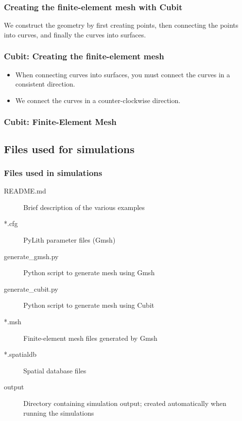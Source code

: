 \documentclass[aspectratio=169]{beamer}
\begin{document}
\begin{frame}
  \frametitle{Creating the finite-element mesh with Cubit}
  \summary{}

  We construct the geometry by first creating points, then connecting the points into curves, and finally the curves into surfaces.
  
  
\end{frame}


\begin{frame}
  \frametitle{Cubit: Creating the finite-element mesh}
  \summary{}
  
  \begin{itemize}
  \item When connecting curves into surfaces, you must connect the curves in a consistent direction.
  \item We connect the curves in a counter-clockwise direction.
  \end{itemize}
  
\end{frame}

\begin{frame}
  \frametitle{Cubit: Finite-Element Mesh}

  
\end{frame}


\subsection{Files used for simulations}

\begin{frame}
  \frametitle{Files used in simulations}

  \begin{description}
  \item[README.md] Brief description of the various examples
  \item[*.cfg] PyLith parameter files (Gmsh)
  \item[generate\_gmsh.py] Python script to generate mesh using Gmsh
  \item[generate\_cubit.py] Python script to generate mesh using Cubit
  \item[*.msh] Finite-element mesh files generated by Gmsh
  \item[*.spatialdb] Spatial database files
  \item[output] Directory containing simulation output; created automatically when running the simulations
  \end{description}

\end{frame}
\end{document}
